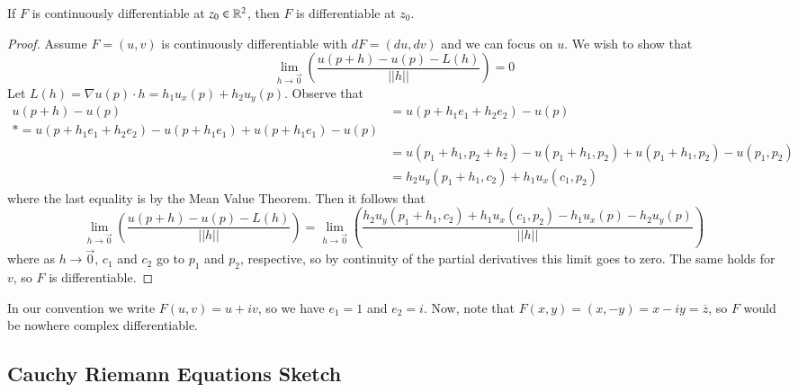 \documentclass[12pt, a4paper, oneside, openright, titlepage]{book}
\begin{document}
\begin{defn}
    If $F$ is continuously differentiable at $z_0 \in \mathbb R^2$, then $F$ is differentiable at $z_0$. 
\end{defn}
\begin{proof}
    Assume $F= (u,v)$ is continuously differentiable with $dF = (du,dv)$ and we can focus on $u$. We wish to show that \begin{equation*}
        \lim\limits_{h\rightarrow \vec{0}}\left(\frac{u(p+h)-u(p)-L(h)}{||h||}\right) = 0
    \end{equation*}
    Let $L(h) = \nabla u(p)\cdot h = h_1u_x(p)+h_2u_y(p)$. Observe that \begin{align*}
        u(p+h)-u(p) &= u(p+h_1e_1+h_2e_2)-u(p) \\
        *= u(p+h_1e_1+h_2e_2) - u(p+h_1e_1)+u(p+h_1e_1)-u(p) \\
        &= u(p_1+h_1,p_2+h_2) - u(p_1+h_1,p_2) + u(p_1+h_1,p_2) - u(p_1,p_2) \\
        &= h_2u_y(p_1+h_1,c_2) + h_1u_x(c_1,p_2)
    \end{align*}
    where the last equality is by the Mean Value Theorem. Then it follows that \begin{equation*}
        \lim\limits_{h\rightarrow \vec{0}}\left(\frac{u(p+h)-u(p)-L(h)}{||h||}\right) = \lim\limits_{h\rightarrow \vec{0}}\left(\frac{h_2u_y(p_1+h_1,c_2) + h_1u_x(c_1,p_2)-h_1u_x(p) - h_2u_y(p)}{||h||}\right) 
    \end{equation*}
    where as $h\rightarrow \vec{0}$, $c_1$ and $c_2$ go to $p_1$ and $p_2$, respective, so by continuity of the partial derivatives this limit goes to zero. The same holds for $v$, so $F$ is differentiable.
\end{proof}


In our convention we write $F(u,v) = u+iv$, so we have $e_1 = 1$ and $e_2 = i$. Now, note that $F(x,y) = (x,-y) = x-iy = \overline{z}$, so $F$ would be nowhere complex differentiable.


        

\subsection{Cauchy Riemann Equations Sketch}
\end{document}
